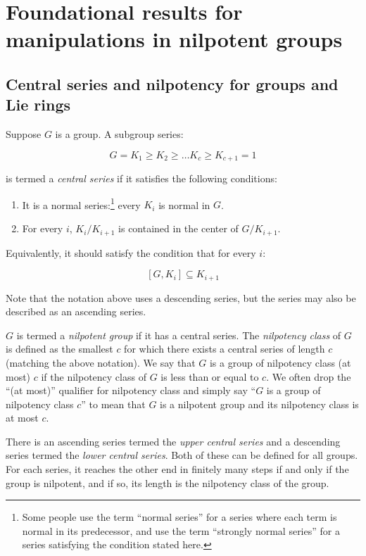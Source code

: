 
\section{Foundational results for manipulations in nilpotent groups}\label{appsec:nilpotent}

\subsection{Central series and nilpotency for groups and Lie rings}\label{appsec:group-basic}

Suppose $G$ is a group. A subgroup series:

$$G = K_1 \ge K_2 \ge \dots K_c \ge K_{c+1} = 1$$

is termed a {\em central series} if it satisfies the following conditions:

\begin{enumerate}
\item It is a normal series:\footnote{Some people use the term
  ``normal series'' for a series where each term is normal in its
  predecessor, and use the term ``strongly normal series'' for a
  series satisfying the condition stated here.} every $K_i$ is normal
  in $G$.
\item For every $i$, $K_i/K_{i+1}$ is contained in the center of $G/K_{i+1}$.
\end{enumerate}

Equivalently, it should satisfy the condition that for every $i$:

$$[G,K_i] \subseteq K_{i+1}$$

Note that the notation above uses a descending series, but the series
may also be described as an ascending series.

$G$ is termed a {\em nilpotent group} if it has a central series. The
{\em nilpotency class} of $G$ is defined as the smallest $c$ for which
there exists a central series of length $c$ (matching the above
notation). We say that $G$ is a group of nilpotency class (at most)
$c$ if the nilpotency class of $G$ is less than or equal to $c$. We
often drop the ``(at most)'' qualifier for nilpotency class and simply
say ``$G$ is a group of nilpotency class $c$'' to mean that $G$ is a
nilpotent group and its nilpotency class is at most $c$.

There is an ascending series termed the {\em upper central series} and
a descending series termed the {\em lower central series}. Both
of these can be defined for all groups. For each series, it reaches
the other end in finitely many steps if and only if the group is
nilpotent, and if so, its length is the nilpotency class of the group.

